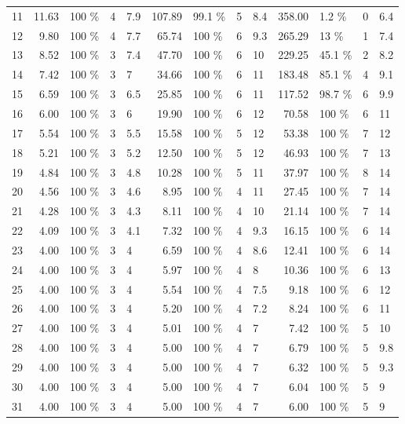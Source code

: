 \begin{tabular}{c|rlll|rlll|rlll}
11 & 11.63 	&100  \% &     4 &   7.9 &107.89 	&99.1 \% &     5 &   8.4 &358.00 	&1.2  \% &     0 &   6.4\\
12 &  9.80 	&100  \% &     4 &   7.7 & 65.74 	&100  \% &     6 &   9.3 &265.29 	&13   \% &     1 &   7.4\\
13 &  8.52 	&100  \% &     3 &   7.4 & 47.70 	&100  \% &     6 &    10 &229.25 	&45.1 \% &     2 &   8.2\\
14 &  7.42 	&100  \% &     3 &     7 & 34.66 	&100  \% &     6 &    11 &183.48 	&85.1 \% &     4 &   9.1\\
15 &  6.59 	&100  \% &     3 &   6.5 & 25.85 	&100  \% &     6 &    11 &117.52 	&98.7 \% &     6 &   9.9\\
16 &  6.00 	&100  \% &     3 &     6 & 19.90 	&100  \% &     6 &    12 & 70.58 	&100  \% &     6 &    11\\
17 &  5.54 	&100  \% &     3 &   5.5 & 15.58 	&100  \% &     5 &    12 & 53.38 	&100  \% &     7 &    12\\
18 &  5.21 	&100  \% &     3 &   5.2 & 12.50 	&100  \% &     5 &    12 & 46.93 	&100  \% &     7 &    13\\
19 &  4.84 	&100  \% &     3 &   4.8 & 10.28 	&100  \% &     5 &    11 & 37.97 	&100  \% &     8 &    14\\
20 &  4.56 	&100  \% &     3 &   4.6 &  8.95 	&100  \% &     4 &    11 & 27.45 	&100  \% &     7 &    14\\
21 &  4.28 	&100  \% &     3 &   4.3 &  8.11 	&100  \% &     4 &    10 & 21.14 	&100  \% &     7 &    14\\
22 &  4.09 	&100  \% &     3 &   4.1 &  7.32 	&100  \% &     4 &   9.3 & 16.15 	&100  \% &     6 &    14\\
23 &  4.00 	&100  \% &     3 &     4 &  6.59 	&100  \% &     4 &   8.6 & 12.41 	&100  \% &     6 &    14\\
24 &  4.00 	&100  \% &     3 &     4 &  5.97 	&100  \% &     4 &     8 & 10.36 	&100  \% &     6 &    13\\
25 &  4.00 	&100  \% &     3 &     4 &  5.54 	&100  \% &     4 &   7.5 &  9.18 	&100  \% &     6 &    12\\
26 &  4.00 	&100  \% &     3 &     4 &  5.20 	&100  \% &     4 &   7.2 &  8.24 	&100  \% &     6 &    11\\
27 &  4.00 	&100  \% &     3 &     4 &  5.01 	&100  \% &     4 &     7 &  7.42 	&100  \% &     5 &    10\\
28 &  4.00 	&100  \% &     3 &     4 &  5.00 	&100  \% &     4 &     7 &  6.79 	&100  \% &     5 &   9.8\\
29 &  4.00 	&100  \% &     3 &     4 &  5.00 	&100  \% &     4 &     7 &  6.32 	&100  \% &     5 &   9.3\\
30 &  4.00 	&100  \% &     3 &     4 &  5.00 	&100  \% &     4 &     7 &  6.04 	&100  \% &     5 &     9\\
31 &  4.00 	&100  \% &     3 &     4 &  5.00 	&100  \% &     4 &     7 &  6.00 	&100  \% &     5 &     9\\
        \end{tabular}\par
